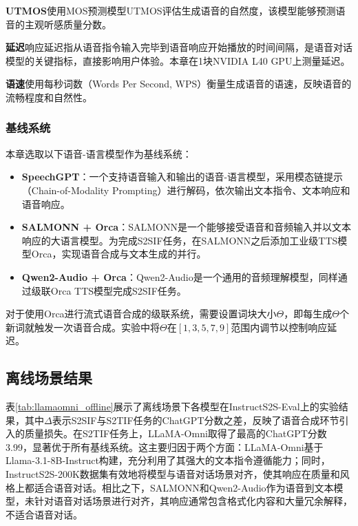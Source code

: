 \textbf{UTMOS}\quad 使用MOS预测模型UTMOS\citep{saeki22c_interspeech}评估生成语音的自然度，该模型能够预测语音的主观听感质量分数。

\textbf{延迟}\quad 响应延迟指从语音指令输入完毕到语音响应开始播放的时间间隔，是语音对话模型的关键指标，直接影响用户体验。本章在1块NVIDIA L40 GPU上测量延迟。

\textbf{语速}\quad 使用每秒词数（Words Per Second, WPS）衡量生成语音的语速，反映语音的流畅程度和自然性。

\subsubsection{基线系统}

本章选取以下语音-语言模型作为基线系统：
\begin{itemize}
    \item \textbf{SpeechGPT}\citep{zhang-etal-2023-speechgpt}：一个支持语音输入和输出的语音-语言模型，采用模态链提示（Chain-of-Modality Prompting）进行解码，依次输出文本指令、文本响应和语音响应。
    \item \textbf{SALMONN + Orca}\citep{tang2024salmonn}：SALMONN是一个能够接受语音和音频输入并以文本响应的大语言模型。为完成S2SIF任务，在SALMONN之后添加工业级TTS模型Orca，实现语音合成与文本生成的并行。
    \item \textbf{Qwen2-Audio + Orca}\citep{Qwen2-Audio}：Qwen2-Audio是一个通用的音频理解模型，同样通过级联Orca TTS模型完成S2SIF任务。
\end{itemize}

\indent 对于使用Orca进行流式语音合成的级联系统，需要设置词块大小$\Theta$，即每生成$\Theta$个新词就触发一次语音合成。实验中将$\Theta$在$[1, 3, 5, 7, 9]$范围内调节以控制响应延迟。

\subsection{离线场景结果}



表\ref{tab:llamaomni_offline}展示了离线场景下各模型在InstructS2S-Eval上的实验结果，其中$\Delta$表示S2SIF与S2TIF任务的ChatGPT分数之差，反映了语音合成环节引入的质量损失。在S2TIF任务上，LLaMA-Omni取得了最高的ChatGPT分数3.99，显著优于所有基线系统。这主要归因于两个方面：LLaMA-Omni基于Llama-3.1-8B-Instruct构建，充分利用了其强大的文本指令遵循能力；同时，InstructS2S-200K数据集有效地将模型与语音对话场景对齐，使其响应在质量和风格上都适合语音对话。相比之下，SALMONN和Qwen2-Audio作为语音到文本模型，未针对语音对话场景进行对齐，其响应通常包含格式化内容和大量冗余解释，不适合语音对话。

